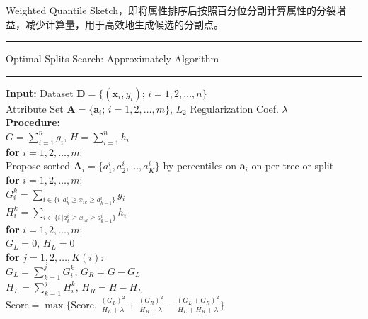 \documentclass[a4paper]{article}
\begin{document}
\begin{itemize}
			Weighted Quantile Sketch，即将属性排序后按照百分位分割计算属性的分裂增益，减少计算量，用于高效地生成候选的分割点。\\
			\noindent\rule[0.10\baselineskip]{\textwidth}{0.75pt}\par
			Optimal Splits Search: Approximately Algorithm\\
			\noindent\rule[0.10\baselineskip]{\textwidth}{0.5pt}
				\textbf{Input:}	Dataset $\textbf{D}=\{(\textbf{x}_i,y_i);\, i = 1,2,\dots, n\}$\\
				\hspace*{32pt}	Attribute Set $\textbf{A} = \{\textbf{a}_i;\,i=1,2,\dots,m\}$, $L_2$ Regularization Coef. $\lambda$\\
				\textbf{Procedure:}\\
				\hspace*{32pt}	$G = \sum_{i=1}^{n}g_i,\,H = \sum_{i=1}^{n}h_i$\\
				\hspace*{32pt}	\textbf{for} $i = 1,2,\dots, m$:\\
				\hspace*{48pt}	Propose sorted $\textbf{A}_i = \{a_1^i,a_2^i,\dots,a_K^i\}$ by percentiles on $\textbf{a}_i$ on per tree or split\\
				\hspace*{32pt}	\textbf{for} $i = 1,2,\dots, m$:\\
				\hspace*{48pt}	$G_i^k = \sum_{i \in \{i\,|a_k^i\geq x_{ik}\geq a_{k-1}^i\}}g_i$\\
				\hspace*{48pt}  $H_i^k = \sum_{i \in \{i\,|a_k^i\geq x_{ik}\geq a_{k-1}^i\}}h_i$\\
				\hspace*{32pt}	\textbf{for} $i = 1,2,\dots, m$:\\
				\hspace*{48pt}	$G_L = 0, \, H_L = 0$\\
				\hspace*{48pt}	\textbf{for} $j = 1,2,\dots,K(i)$:\\
				\hspace*{64pt}	$G_L = \sum_{k=1}^{j}G_i^k,\, G_R = G - G_L$\\
				\hspace*{64pt}  $H_L = \sum_{k=1}^{j}H_i^k,\, H_R = H - H_L$\\
				\hspace*{48pt}  $\text{Score} = \max\{\text{Score},\,\frac{(G_L)^2}{H_L+\lambda}+\frac{(G_R)^2}{H_R+\lambda}- \frac{(G_L+G_R)^2}{H_L+H_R+\lambda}\}$\\

\end{itemize}
\end{document}
